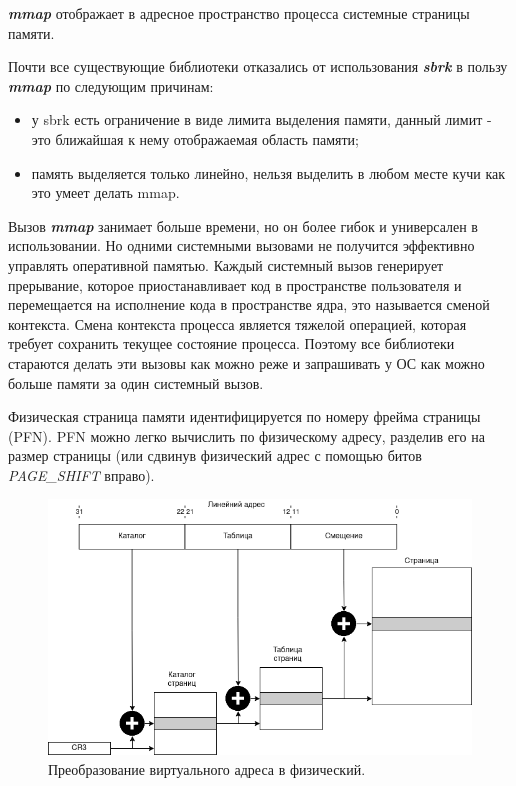 \textbf{\textit{mmap}} отображает в адресное пространство процесса системные страницы памяти.

Почти все существующие библиотеки отказались от использования \textbf{\textit{sbrk}} в пользу \textbf{\textit{mmap}} по следующим причинам:
\begin{itemize}
	\item у sbrk есть ограничение в виде лимита выделения памяти, данный лимит - это ближайшая к нему отображаемая область памяти;
	\item память выделяется только линейно, нельзя выделить в любом месте кучи как это умеет делать mmap.
\end{itemize}

Вызов \textbf{\textit{mmap}} занимает больше времени, но он более гибок и универсален в использовании. Но одними системными вызовами не получится эффективно управлять оперативной памятью. Каждый системный вызов генерирует прерывание, которое приостанавливает код в пространстве пользователя и перемещается   на исполнение кода в пространстве  ядра, это называется сменой контекста. Смена контекста процесса является тяжелой операцией, которая требует сохранить текущее состояние процесса. Поэтому все библиотеки стараются делать эти вызовы как можно реже и запрашивать у ОС как можно больше памяти за один системный вызов.

Физическая страница памяти идентифицируется по номеру фрейма страницы (PFN)\cite{page-frame}. PFN можно легко вычислить по физическому адресу, разделив его на размер страницы (или сдвинув физический адрес с помощью битов \textit{PAGE\_SHIFT} вправо).

\begin{figure}[!h]
	\begin{center}
		\includegraphics[scale=0.6]{images/memory-mapping.png}
		\caption{Преобразование виртуального адреса в физический.}
		\label{memory-mapping}
	\end{center}
\end{figure}

